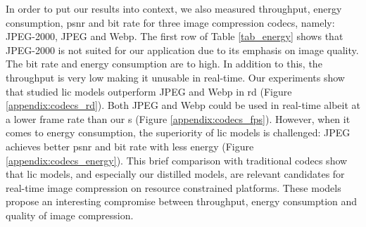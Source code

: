 \documentclass{article}
\begin{document}
In order to put our results into context, we also measured throughput, energy consumption, \acrshort{psnr} and bit rate for three image compression codecs, namely: JPEG-2000, JPEG and Webp. The first row of Table \ref{tab_energy} shows that JPEG-2000 is not suited for our application due to its emphasis on image quality. The bit rate and energy consumption are to high. In addition to this, the throughput is very low making it unusable in real-time. Our experiments show that studied \acrshort{lic} models outperform JPEG and Webp in \acrshort{rd} (Figure \ref{appendix:codecs_rd}). Both JPEG and Webp could be used in real-time albeit at a lower frame rate than our s (Figure \ref{appendix:codecs_fps}). However, when it comes to energy consumption, the superiority of \acrshort{lic} models is challenged: JPEG achieves better \acrshort{psnr} and bit rate with less energy (Figure \ref{appendix:codecs_energy}). This brief comparison with traditional codecs show that \acrshort{lic} models, and especially our distilled models, are relevant candidates for real-time image compression on resource constrained platforms. These models propose an interesting compromise between throughput, energy consumption and quality of image compression.
\end{document}
